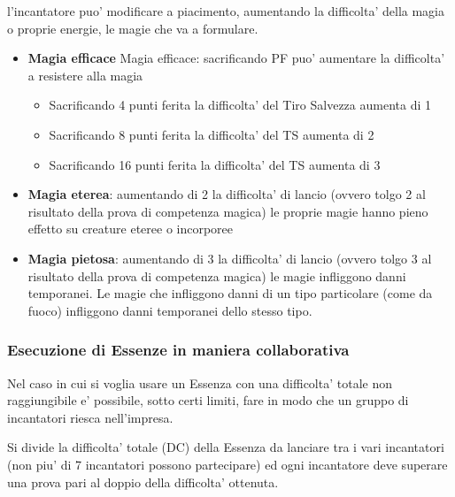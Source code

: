 \documentclass[a4paper,11pt,twoside,openany]{dndbook}
\begin{document}
\label{alterare-le-essenze}

l'incantatore puo' modificare a piacimento, aumentando la difficolta' della magia o proprie energie, le magie che va a formulare.

\begin{itemize}
\item 
\textbf{Magia efficace} 
Magia efficace: sacrificando PF puo’ aumentare la difficolta’ a resistere alla magia
\begin{itemize}
	\item Sacrificando 4 punti ferita la difficolta’ del Tiro Salvezza aumenta di 1
	\item Sacrificando 8 punti ferita la difficolta’ del TS aumenta di 2

	\item Sacrificando 16 punti ferita la difficolta’ del TS aumenta di 3
\end{itemize}
\end{itemize}
%
\begin{itemize}
\item 
\textbf{Magia eterea}: aumentando di 2 la difficolta' di lancio (ovvero tolgo 2 al risultato della prova di competenza magica) le proprie magie hanno pieno effetto su creature eteree o incorporee 
\end{itemize}
%
\begin{itemize}
\item 
\textbf{Magia pietosa}: aumentando di 3 la difficolta' di lancio (ovvero tolgo 3 al risultato della prova di competenza magica) le magie infliggono danni temporanei. Le magie che infliggono danni di un tipo particolare (come da fuoco) infliggono danni temporanei dello stesso tipo. 
\end{itemize}

\subsubsection{Esecuzione di Essenze in maniera collaborativa}

Nel caso in cui si voglia usare un Essenza con una difficolta' totale non raggiungibile e' possibile, sotto certi limiti, fare in modo che un gruppo di incantatori riesca nell'impresa.

Si divide la difficolta' totale (DC) della Essenza da lanciare tra i vari incantatori (non piu' di 7 incantatori possono partecipare) ed ogni incantatore deve superare una prova pari al doppio della difficolta' ottenuta.
\end{document}
